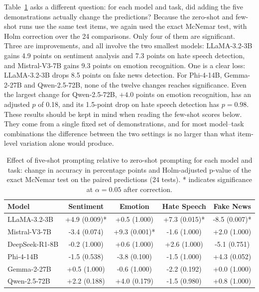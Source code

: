 \documentclass[10pt,letterpaper]{article}
\begin{document}
Table~\ref{tab:fewshot_effect} asks a different question: for each model and task, did adding the five demonstrations actually change the predictions? Because the zero-shot and few-shot runs use the same test items, we again used the exact McNemar test, with Holm correction over the 24 comparisons. Only four of them are significant. Three are improvements, and all involve the two smallest models: LLaMA-3.2-3B gains 4.9 points on sentiment analysis and 7.3 points on hate speech detection, and Mistral-V3-7B gains 9.3 points on emotion recognition. One is a clear loss: LLaMA-3.2-3B drops 8.5 points on fake news detection. For Phi-4-14B, Gemma-2-27B and Qwen-2.5-72B, none of the twelve changes reaches significance. Even the largest change for Qwen-2.5-72B, $+4.0$ points on emotion recognition, has an adjusted $p$ of 0.18, and its 1.5-point drop on hate speech detection has $p = 0.98$. These results should be kept in mind when reading the few-shot scores below. They come from a single fixed set of demonstrations, and for most model--task combinations the difference between the two settings is no larger than what item-level variation alone would produce.

\begin{table}[!t]
\centering
\small
\caption{Effect of five-shot prompting relative to zero-shot prompting for each model and task: change in accuracy in percentage points and Holm-adjusted p-value of the exact McNemar test on the paired predictions (24 tests). * indicates significance at $\alpha = 0.05$ after correction.}
\label{tab:fewshot_effect}
\renewcommand{\arraystretch}{1.1}
\setlength{\tabcolsep}{4pt}
\begin{tabular}{|l|c|c|c|c|}
\hline
\textbf{Model} & \textbf{Sentiment} & \textbf{Emotion} & \textbf{Hate Speech} & \textbf{Fake News} \\ \hline
LLaMA-3.2-3B & +4.9 (0.009)* & +0.5 (1.000) & +7.3 (0.015)* & -8.5 (0.007)* \\ \hline
Mistral-V3-7B & -3.4 (0.074) & +9.3 (0.001)* & -1.6 (1.000) & +2.0 (1.000) \\ \hline
DeepSeek-R1-8B & -0.2 (1.000) & +0.6 (1.000) & +2.6 (1.000) & -5.1 (0.751) \\ \hline
Phi-4-14B & -1.5 (0.538) & -3.8 (0.100) & -1.5 (1.000) & +4.3 (0.052) \\ \hline
Gemma-2-27B & +0.5 (1.000) & -0.6 (1.000) & -2.2 (0.192) & +0.0 (1.000) \\ \hline
Qwen-2.5-72B & +2.2 (0.188) & +4.0 (0.179) & -1.5 (0.980) & +0.8 (1.000) \\ \hline
\end{tabular}
\end{table}
\end{document}
